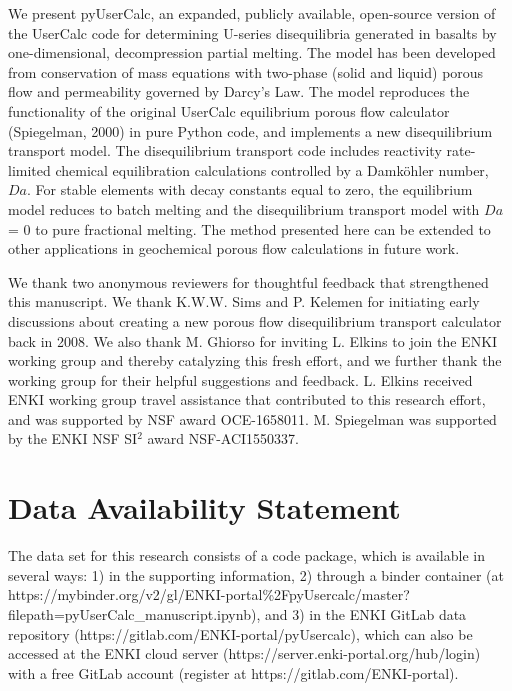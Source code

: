 \documentclass[draft]{agujournal2019}
\begin{document}
We present pyUserCalc, an expanded, publicly available, open-source version of the UserCalc code for determining U-series disequilibria generated in basalts by one-dimensional, decompression partial melting. The model has been developed from conservation of mass equations with two-phase (solid and liquid) porous flow and permeability governed by Darcy's Law. The model reproduces the functionality of the original UserCalc equilibrium porous flow calculator (Spiegelman, 2000) in pure Python code, and implements a new disequilibrium transport model. The disequilibrium transport code includes reactivity rate-limited chemical equilibration calculations controlled by a Damköhler number, $Da$. For stable elements with decay constants equal to zero, the equilibrium model reduces to batch melting and the disequilibrium transport model with $Da$ = 0 to pure fractional melting. The method presented here can be extended to other applications in geochemical porous flow calculations in future work.


\acknowledgments

We thank two anonymous reviewers for thoughtful feedback that strengthened this manuscript. We thank K.W.W. Sims and P. Kelemen for initiating early discussions about creating a new porous flow disequilibrium transport calculator back in 2008. We also thank M. Ghiorso for inviting L. Elkins to join the ENKI working group and thereby catalyzing this fresh effort, and we further thank the working group for their helpful suggestions and feedback. L. Elkins received ENKI working group travel assistance that contributed to this research effort, and was supported by NSF award OCE-1658011. M. Spiegelman was supported by the ENKI NSF SI$^2$ award NSF-ACI1550337.


\section*{Data Availability Statement}

The data set for this research consists of a code package, which is available in several ways: 1) in the supporting information, 2) through a binder container (at https://mybinder.org/v2/gl/ENKI-portal\%2FpyUsercalc/master?filepath=pyUserCalc\_manuscript.ipynb), and 3) in the ENKI GitLab data repository (https://gitlab.com/ENKI-portal/pyUsercalc), which can also be accessed at the ENKI cloud server (https://server.enki-portal.org/hub/login) with a free GitLab account (register at https://gitlab.com/ENKI-portal).
\end{document}
